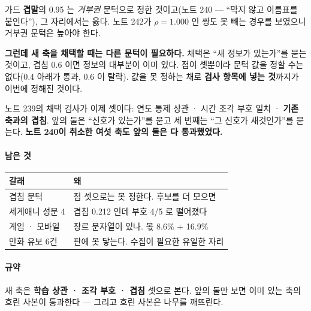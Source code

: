 \documentclass[10pt]{article}
\begin{document}
가드 \textbf{겹말}의 0.95 는 \emph{거부권} 문턱으로 정한 것이고(노트 240 ---
``막지 않고 이름표를 붙인다''), 그 자리에서는 옳다. 노트 242가 $\rho{=}1.000$
인 쌍도 못 빼는 경우를 보였으니 거부권 문턱은 높아야 한다.

\textbf{그런데 새 축을 채택할 때는 다른 문턱이 필요하다.} 채택은 ``새 정보가
있는가''를 묻는 것이고, 겹침 0.6 이면 정보의 대부분이 이미 있다. 점이 셋뿐이라
문턱 값을 정할 수는 없다(0.4 아래가 통과, 0.6 이 탈락). 값을 못 정하는 채로
\textbf{검사 항목에 넣는 것}까지가 이번에 정해진 것이다.

노트 239의 채택 검사가 이제 셋이다: 연도 통제 상관 · 시간 조각 부호 일치 ·
\textbf{기존 축과의 겹침}. 앞의 둘은 ``신호가 있는가''를 묻고 세 번째는
``그 신호가 새것인가''를 묻는다. \textbf{노트 240이 취소한 여섯 축도 앞의
둘은 다 통과했었다.}

\paragraph{남은 것}
\begin{center}\small
\begin{tabular}{ll}
\hline
갈래 & 왜 \\
\hline
겹침 문턱 & 점 셋으로는 못 정한다. 후보를 더 모으면 \\
세계애니 성분 4 & 겹침 0.212 인데 부호 4/5 로 떨어졌다 \\
게임 · 모바일 & 장르 문자열이 있나. 몫 8.6\% $+$ 16.9\% \\
만화 유보 6건 & 판에 못 닿는다. 수집이 필요한 유일한 자리 \\
\hline
\end{tabular}
\end{center}

\paragraph{규약} 새 축은 \textbf{학습 상관 · 조각 부호 · 겹침} 셋으로 본다.
앞의 둘만 보면 이미 있는 축의 흐린 사본이 통과한다 --- 그리고 흐린 사본은
나무를 깨뜨린다.
\end{document}
